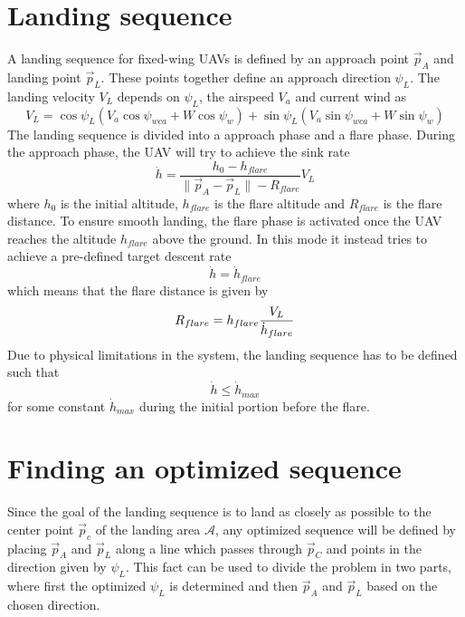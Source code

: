\section{Landing sequence}
A landing sequence for fixed-wing UAVs is defined by an approach point $\vec{p}_A$ and landing point $\vec{p}_L$. These points together 
define an approach direction $\psi_L$. The landing velocity $V_L$ depends on $\psi_L$, the airspeed $V_a$ and current wind as 
\begin{equation}
    V_L=\cos\psi_L(V_a\cos\psi_{wca}+W\cos\psi_w) + \sin\psi_L(V_a\sin\psi_{wca}+W\sin\psi_w)
\end{equation}
The landing sequence is divided into a approach phase and a flare phase. During the approach phase, the UAV will try to 
achieve the sink rate 
\begin{equation}\label{eq:sink_rate}
    \dot{h}=\frac{h_0-h_{flare}}{\|\vec{p}_A-\vec{p}_L\|-R_{flare}}V_L
\end{equation}
where $h_0$ is the initial altitude, $h_{flare}$ is the flare altitude and $R_{flare}$ is the flare distance.
To ensure smooth landing, the flare phase is activated once the UAV reaches the altitude $h_{flare}$ above the ground. 
In this mode it instead tries to achieve a pre-defined target descent rate 
\begin{equation}
    \dot{h}=\dot{h}_{flare}
\end{equation}
which means that the flare distance is given by
\begin{equation}\label{eq:R_{flare}lare}
    R_{flare}=h_{flare}\frac{V_L}{\dot{h}_{flare}}
\end{equation}
Due to physical limitations in the system, the landing sequence has to be defined such that 
\begin{equation}\label{eq:sink_constraint}
    \dot{h}\leq\dot{h}_{max}
\end{equation}
for some constant $\dot{h}_{max}$ during the initial portion before the flare.

\section{Finding an optimized sequence}
Since the goal of the landing sequence is to land as closely as possible to the center point $\vec{p}_c$ of the landing area $\mathcal{A}$, any 
optimized sequence will be defined by placing $\vec{p}_A$ and $\vec{p}_L$ along a line which passes through $\vec{p}_C$ and points in the direction given by $\psi_L$.
This fact can be used to divide the problem in two parts, where first the optimized $\psi_L$ is determined and then $\vec{p}_A$ and $\vec{p}_L$ based on the chosen direction.

